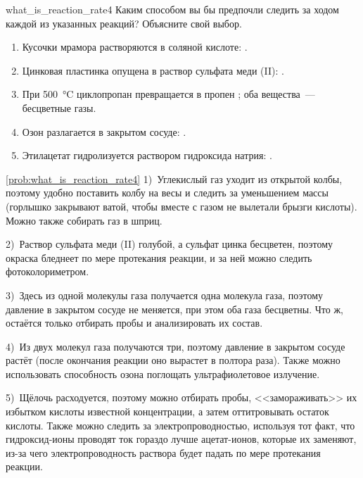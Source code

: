 \begin{problem}{}{what_is_reaction_rate4}
    Каким способом вы бы предпочли следить за ходом каждой из указанных реакций? Объясните свой выбор.
    \begin{enumerate}[label=\arabic*)]
        \item Кусочки мрамора растворяются в соляной кислоте: .
        \item Цинковая пластинка опущена в раствор сульфата меди (II): .
        \item При \qty{500}{\degreeCelsius} циклопропан превращается в пропен ; оба вещества~--- бесцветные газы.
        \item Озон разлагается в закрытом сосуде: .
        \item Этилацетат гидролизуется раствором гидроксида натрия: .
    \end{enumerate}
    \begin{sol}{\ref{prob:what_is_reaction_rate4}}
        1)~Углекислый газ уходит из открытой колбы, поэтому удобно поставить колбу на весы и следить за уменьшением массы (горлышко закрывают ватой, чтобы вместе с газом не вылетали брызги кислоты). Можно также собирать газ в шприц.

        2)~Раствор сульфата меди (II) голубой, а сульфат цинка бесцветен, поэтому окраска бледнеет по мере протекания реакции, и за ней можно следить фотоколориметром.

        3)~Здесь из одной молекулы газа получается одна молекула газа, поэтому давление в закрытом сосуде не меняется, при этом оба газа бесцветны. Что ж, остаётся только отбирать пробы и анализировать их состав.

        4)~Из двух молекул газа получаются три, поэтому давление в закрытом сосуде растёт (после окончания реакции оно вырастет в полтора раза). Также можно использовать способность озона поглощать ультрафиолетовое излучение.

        5)~Щёлочь расходуется, поэтому можно отбирать пробы, <<замораживать>> их избытком кислоты известной концентрации, а затем оттитровывать остаток кислоты. Также можно следить за электропроводностью, используя тот факт, что гидроксид-ионы проводят ток гораздо лучше ацетат-ионов, которые их заменяют, из-за чего электропроводность раствора будет падать по мере протекания реакции.
    \end{sol}
\end{problem}

